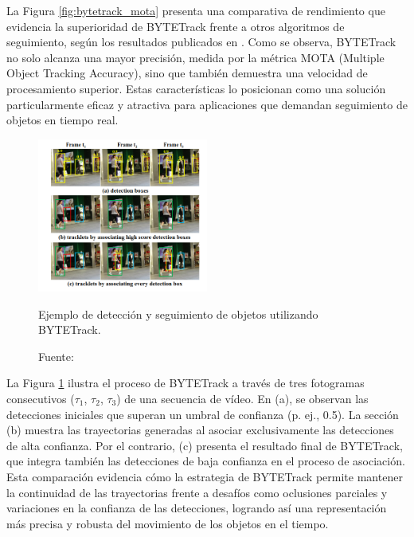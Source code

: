 \documentclass[11pt,spanish,listoffigures,listoftables]{tfgetsinf}
\begin{document}
La Figura \ref{fig:bytetrack_mota} presenta una comparativa de rendimiento que evidencia la superioridad de BYTETrack frente a otros algoritmos de seguimiento, según los resultados publicados en \cite{zhang2022bytetrackmultiobjecttrackingassociating}. Como se observa, BYTETrack no solo alcanza una mayor precisión, medida por la métrica MOTA (Multiple Object Tracking Accuracy), sino que también demuestra una velocidad de procesamiento superior. Estas características lo posicionan como una solución particularmente eficaz y atractiva para aplicaciones que demandan seguimiento de objetos en tiempo real.

\begin{figure}[H]

   \centering
   \includegraphics[width=0.5\textwidth]{images/estado_del_arte/BYTETrack_deteccion.png}
   \caption{Ejemplo de detección y seguimiento de objetos utilizando BYTETrack.}
   \label{fig:bytetrack_deteccion}
   \caption*{Fuente: \cite{zhang2022bytetrackmultiobjecttrackingassociating}}
\end{figure}

La Figura \ref{fig:bytetrack_deteccion} ilustra el proceso de BYTETrack a través de tres fotogramas consecutivos ($\tau_1$, $\tau_2$, $\tau_3$) de una secuencia de vídeo. En (a), se observan las detecciones iniciales que superan un umbral de confianza (p. ej., 0.5). La sección (b) muestra las trayectorias generadas al asociar exclusivamente las detecciones de alta confianza. Por el contrario, (c) presenta el resultado final de BYTETrack, que integra también las detecciones de baja confianza en el proceso de asociación. Esta comparación evidencia cómo la estrategia de BYTETrack permite mantener la continuidad de las trayectorias frente a desafíos como oclusiones parciales y variaciones en la confianza de las detecciones, logrando así una representación más precisa y robusta del movimiento de los objetos en el tiempo.
\end{document}

